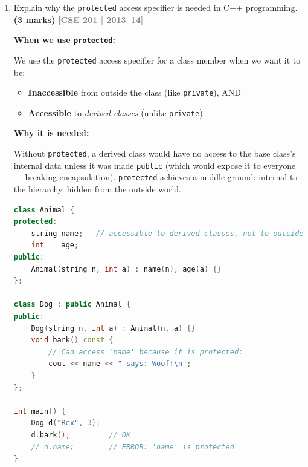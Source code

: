 \documentclass[12pt,a3paper]{article}
\newcommand{\yr}[1]{\hfill\textcolor{gray}{\small\textbf{[#1]}}}
\newcommand{\mk}[1]{\textcolor{orange!70!black}{\small\textbf{(#1 marks)}}}
\begin{document}
\begin{enumerate}
\begin{tcolorbox}
\begin{lstlisting}[language=C++]
int main() {
    Shape* s;
    s = new Circle(); s->draw();  // Circle -- run-time dispatch
    s = new Square(); s->draw();  // Square -- run-time dispatch
}
\end{lstlisting}
\end{tcolorbox}

\item Explain why the \texttt{protected} access specifier is needed in C++ programming. \mk{3}
\yr{CSE 201 | 2013--14}

\begin{tcolorbox}[enhanced,breakable,ansbox,colback=cB!4,colframe=cB,
  boxrule=0.8pt,arc=5pt,
  title={\textbf{Answer}},fonttitle=\bfseries\color{white},colbacktitle=cB]

\textbf{When we use \texttt{protected}:}

We use the \texttt{protected} access specifier for a class member
when we want it to be:
\begin{itemize}[itemsep=2pt]
  \item \textbf{Inaccessible} from outside the class (like
    \texttt{private}), AND
  \item \textbf{Accessible} to \emph{derived classes} (unlike
    \texttt{private}).
\end{itemize}

\textbf{Why it is needed:}

Without \texttt{protected}, a derived class would have no access to
the base class's internal data unless it was made \texttt{public}
(which would expose it to everyone --- breaking encapsulation).
\texttt{protected} achieves a middle ground: internal to the
hierarchy, hidden from the outside world.

\begin{lstlisting}[language=C++]
class Animal {
protected:
    string name;   // accessible to derived classes, not to outside
    int    age;
public:
    Animal(string n, int a) : name(n), age(a) {}
};

class Dog : public Animal {
public:
    Dog(string n, int a) : Animal(n, a) {}
    void bark() const {
        // Can access 'name' because it is protected:
        cout << name << " says: Woof!\n";
    }
};

int main() {
    Dog d("Rex", 3);
    d.bark();         // OK
    // d.name;        // ERROR: 'name' is protected
}
\end{lstlisting}

\end{tcolorbox}


\end{enumerate}
\end{document}
